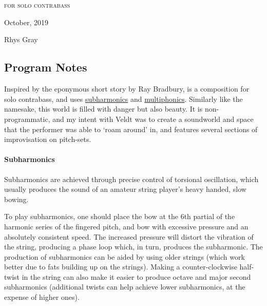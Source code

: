 
\chapter[\bassPiece]{}

\vspace*{3cm}
\begin{center}
\textsc{for solo contrabass}

\vspace*{3.5cm}

\HRule{0.5pt}


\LARGE \textbf{\uppercase{\bassPiece}}
\HRule{2pt}

\vspace{1.3cm}

\normalsize October, 2019
\date{}

\vspace*{5\baselineskip}

Rhys Gray

\end{center}
\newpage
\newpage

\section*{Program Notes}
Inspired by the eponymous short story by Ray Bradbury, \bassPiece\space is a composition for solo contrabass, and uses \hyperref[sec:subharmonics]{subharmonics} and \hyperref[sec:multiphonics]{multiphonics}. 
Similarly like the namesake, this world is filled with danger but also beauty. 
It is non-programmatic, and my intent with Veldt was to create a soundworld and space that the performer was able to `roam around' in, and features several sections of improvisation on pitch-sets.

\subsubsection*{Subharmonics}
Subharmonics are achieved through precise control of torsional oscillation, which usually produces the sound of an amateur string player's heavy handed, slow bowing. 

To play subharmonics, one should place the bow at the 6th partial of the harmonic series of the fingered pitch, and bow with excessive pressure and an absolutely consistent speed. 
The increased pressure will distort the vibration of the string, producing a phase loop which, in turn, produces the subharmonic. 
The production of subharmonics can be aided by using older strings (which work better due to fats building up on the strings). 
Making a counter-clockwise half-twist in the string can also make it easier to produce octave and major second subharmonics (additional twists can help achieve lower subharmonics, at the expense of higher ones).


